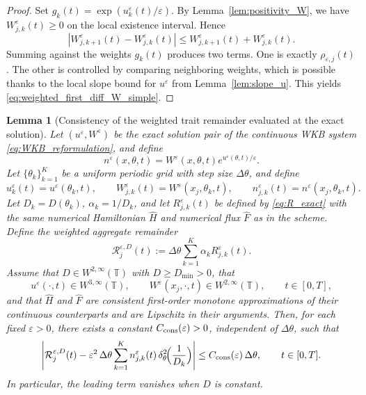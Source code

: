 \documentclass[11pt, dina4, amsfont12]{article}
\newtheorem{lemma}{Lemma}[section]
\begin{document}
\begin{proof}
Set \(g_k(t)=\exp(u_k^\varepsilon(t)/\varepsilon)\). By Lemma~\ref{lem:positivity_W}, we have \(W_{j,k}^\varepsilon(t)\ge0\) on the local existence interval. Hence
\[
|W_{j,k+1}^\varepsilon(t)-W_{j,k}^\varepsilon(t)|
\le W_{j,k+1}^\varepsilon(t)+W_{j,k}^\varepsilon(t).
\]
Summing against the weights \(g_k(t)\) produces two terms. One is exactly \(\rho_{\varepsilon,j}(t)\). The other is controlled by comparing neighboring weights, which is possible thanks to the local slope bound for \(u^\varepsilon\) from Lemma~\ref{lem:slope_u}. This yields \eqref{eq:weighted_first_diff_W_simple}.
\end{proof}

\begin{lemma}[Consistency of the weighted trait remainder evaluated at the exact solution]\label{lem:consistency_R_divD}
Let \((u^\varepsilon,W^\varepsilon)\) be the exact solution pair of the continuous WKB system \eqref{eq:WKB_reformulation}, and define
\[
n^\varepsilon(x,\theta,t)=W^\varepsilon(x,\theta,t)e^{u^\varepsilon(\theta,t)/\varepsilon}.
\]
Let \(\{\theta_k\}_{k=1}^K\) be a uniform periodic grid with step size \(\Delta\theta\), and define
\[
u_k^\varepsilon(t)=u^\varepsilon(\theta_k,t),
\qquad
W_{j,k}^\varepsilon(t)=W^\varepsilon(x_j,\theta_k,t),
\qquad
n_{j,k}^\varepsilon(t)=n^\varepsilon(x_j,\theta_k,t).
\]
Let \(D_k=D(\theta_k)\), \(\alpha_k=1/D_k\), and let \(R_{j,k}^\varepsilon(t)\) be defined by \eqref{eq:R_exact} with the same numerical Hamiltonian \(\widehat H\) and numerical flux \(\widehat F\) as in the scheme. Define the weighted aggregate remainder
\[
\mathcal R_j^{\varepsilon,D}(t)
:=
\Delta\theta\sum_{k=1}^K \alpha_k R_{j,k}^\varepsilon(t).
\]
Assume that \(D\in W^{2,\infty}(\mathbb T)\) with \(D\ge D_{\min}>0\), that
\[
u^\varepsilon(\cdot,t)\in W^{3,\infty}(\mathbb T),
\qquad
W^\varepsilon(x_j,\cdot,t)\in W^{2,\infty}(\mathbb T),
\qquad t\in[0,T],
\]
and that \(\widehat H\) and \(\widehat F\) are consistent first-order monotone approximations of their continuous counterparts and are Lipschitz in their arguments. Then, for each fixed \(\varepsilon>0\), there exists a constant \(C_{\rm cons}(\varepsilon)>0\), independent of \(\Delta\theta\), such that
\begin{equation}\label{eq:consistency_main}
\left|
\mathcal R_j^{\varepsilon,D}(t)
-\varepsilon^2\,\Delta\theta\sum_{k=1}^K n_{j,k}^\varepsilon(t)\,\delta_\theta^2\!\Bigl(\frac1{D_k}\Bigr)
\right|
\le C_{\rm cons}(\varepsilon)\,\Delta\theta,
\qquad t\in[0,T].
\end{equation}
In particular, the leading term vanishes when \(D\) is constant.
\end{lemma}
\end{document}

